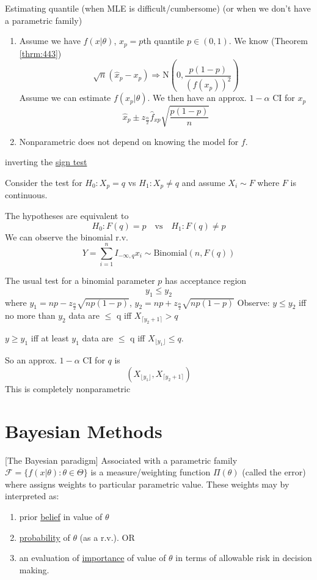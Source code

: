 \documentclass[english, 11pt]{article}
\newcommand{\lp}{\left(}
\newcommand{\rp}{\right)}
\begin{document}
\begin{exmp}
Estimating quantile (when MLE is difficult/cumbersome) (or when we don't have a parametric family)
\begin{enumerate}
\item Assume we have $f(x|\theta)$, $x_p=p$th quantile $p\in(0, 1)$. We know (Theorem \ref{thrm:443})
$$
\sqrt{n}(\hat{x}_p-x_p)\Rightarrow\text{N}\lp0, \frac{p(1-p)}{(f(x_p))^2}\rp
$$
Assume we can estimate $f(x_p|\theta)$. We then have an approx. $1-\alpha$ CI for $x_p$
$$
\hat{x}_p\pm z_{\frac{\alpha}{2}}\hat{f}_{xp}\sqrt{\frac{p(1-p)}{n}}
$$
\item Nonparametric does not depend on knowing the model for $f$.
\end{enumerate}

inverting the \underline{sign test}

Consider the test for $H_0:X_p=q$ vs $H_1:X_p\not=q$ and assume $X_i\sim F$ where $F$ is continuous.

The hypotheses are equivalent to
$$
H_0:F(q)=p\quad\text{vs}\quad H_1:F(q)\not=p
$$
We can observe the binomial r.v.
$$
Y=\sum_{i=1}^n I_{-\infty, q}x_i\sim\text{Binomial}(n, F(q))
$$

The usual test for a binomial parameter $p$ has acceptance region
$$
y_1\leqslant y_2
$$
where $y_1=np-z_{\frac{\alpha}{2}}\sqrt{np(1-p)}$, $y_2=np+z_{\frac{\alpha}{2}}\sqrt{np(1-p)}$
Observe: $y\leqslant y_2$ iff no more than $y_2$ data are $\leqslant$ q iff $X_{\lceil y_2+1\rceil}>q$

$y\geqslant y_1$ iff at least $y_1$ data are $\leqslant$ q iff $X_{\lfloor y_1\rfloor}\leqslant q$.

So an approx. $1-\alpha$ CI for $q$ is 
$$
(X_{\lfloor y_1\rfloor}, X_{\lceil y_2+1\rceil})
$$
This is completely nonparametric
\end{exmp}


\section{Bayesian Methods}

\begin{defn}\label{defn:71}[The Bayesian paradigm]
Associated with a parametric family $\mathscr{F}=\{f(x|\theta):\theta\in \Theta\}$ is a measure/weighting function $\Pi(\theta)$ (called the error) where assigns weights to particular parametric value. These weights may by interpreted as:
\begin{enumerate}
\item prior \underline{belief} in value of $\theta$
\item \underline{probability} of $\theta$ (as a r.v.). OR
\item an evaluation of \underline{importance} of value of $\theta$ in terms of allowable risk in decision making.
\end{enumerate}
\end{defn}








\end{document}
